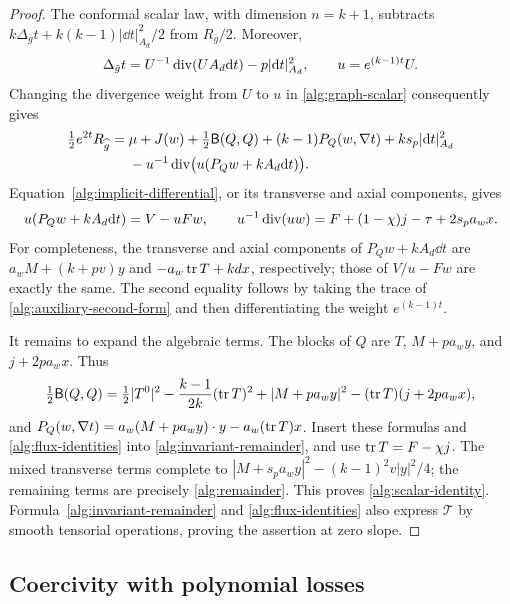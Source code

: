 \begin{proof}
The conformal scalar law, with dimension $n=k+1$, subtracts
$k\Delta_{\bar g}t+k(k-1)|\dd t|_{A_d}^2/2$ from
$R_{\bar g}/2$.  Moreover,
\[
 \Delta_{\bar g}t
 =U^{-1}\operatorname{div}(UA_d\mathrm d t)-p|\mathrm d t|_{A_d}^2,
 \qquad u=e^{(k-1)t}U.
\]
Changing the divergence weight from $U$ to $u$ in
\eqref{alg:graph-scalar} consequently gives
\begin{equation}
\begin{split}
 \tfrac12e^{2t}R_{\widehat g}={}&\mu+J(w)
 +\tfrac12\mathsf B(Q,Q)+(k-1)P_Q(w,\nabla t)
 +ks_p|\mathrm d t|_{A_d}^2\\
 &-u^{-1}\operatorname{div}\bigl(u(P_Qw+kA_d\mathrm d t)\bigr).
\end{split}
\label{alg:invariant-remainder}
\end{equation}
Equation~\eqref{alg:implicit-differential}, or its transverse and axial
components, gives
\begin{equation}
 u(P_Qw+kA_d\mathrm d t)=V-uFw,
 \qquad
 u^{-1}\operatorname{div}(uw)=F+(1-\chi)j-\tau+2s_pa_wx.
 \label{alg:flux-identities}
\end{equation}
For completeness, the transverse and axial components of
$P_Qw+kA_d\dd t$ are
$a_wM+(k+pv)y$ and $-a_w\operatorname{tr} T+kdx$, respectively; those of
$V/u-Fw$ are exactly the same.  The second equality follows by taking
the trace of \eqref{alg:auxiliary-second-form} and then differentiating
the weight $e^{(k-1)t}$.

It remains to expand the algebraic terms.  The blocks of $Q$ are
$T$, $M+pa_wy$, and $j+2pa_wx$.  Thus
\[
 \tfrac12\mathsf B(Q,Q)
 =\tfrac12|T^0|^2-\frac{k-1}{2k}(\operatorname{tr} T)^2
   +|M+pa_wy|^2-(\operatorname{tr} T)(j+2pa_wx),
\]
and
$P_Q(w,\nabla t)=a_w(M+pa_wy)\cdot y-a_w(\operatorname{tr} T)x$.
Insert these formulas and \eqref{alg:flux-identities} into
\eqref{alg:invariant-remainder}, and use $\operatorname{tr} T=F-\chi j$.
The mixed transverse terms complete to
$|M+s_pa_wy|^2-(k-1)^2v|y|^2/4$; the remaining terms are precisely
\eqref{alg:remainder}.  This proves \eqref{alg:scalar-identity}.
Formula~\eqref{alg:invariant-remainder} and
\eqref{alg:flux-identities} also express $\mathcal T$ by smooth
tensorial operations, proving the assertion at zero slope.
\end{proof}

\subsection{Coercivity with polynomial losses}

